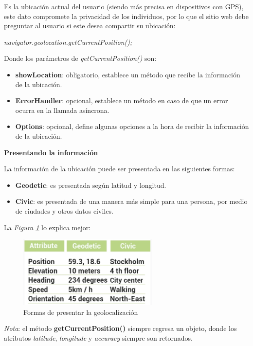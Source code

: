 Es la ubicación actual del usuario (siendo más precisa en dispositivos con GPS), este dato compromete la privacidad de los individuos, por lo que el sitio web debe preguntar al usuario si este desea compartir su ubicación:
\begin{center}
    \textit{navigator.geolocation.getCurrentPosition();}
\end{center}

Donde los parámetros de \textit{getCurrentPosition()} son:
\begin{itemize}
    \item \textbf{showLocation}: obligatorio, establece un método que recibe la información de la ubicación.
    \item \textbf{ErrorHandler}: opcional, establece un método en caso de que un error ocurra en la llamada asíncrona.
    \item \textbf{Options}: opcional, define algunas opciones a la hora de recibir la información de la ubicación.
\end{itemize}

\textbf{Presentando la información}

La información de la ubicación puede ser presentada en las siguientes formas:
\begin{itemize}
    \item \textbf{Geodetic}: es presentada según latitud y longitud.
    \item \textbf{Civic}: es presentada de una manera más simple para una persona, por medio de ciudades y otros datos civiles.
\end{itemize}

La \textit{Figura \ref{fig: 18}} lo explica mejor:
\begin{figure}[H]
    \centering
    \caption{Formas de presentar la geolocalización}
    \label{fig: 18}
    \includegraphics[width=7cm]{ss_html/geolocation.png}
\end{figure}

\textit{Nota}: el método \textbf{getCurrentPosition()} siempre regresa un objeto, donde los atributos \textit{latitude}, \textit{longitude} y \textit{accuracy} siempre son retornados.

